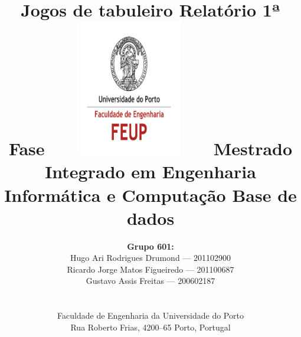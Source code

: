\documentclass[a4paper]{article}
\begin{document}
\setlength{\textwidth}{16cm}
\setlength{\textheight}{22cm}

\title{\Huge\textbf{Jogos de tabuleiro}\linebreak\linebreak\linebreak
\Large\textbf{Relatório 1ª Fase}\linebreak\linebreak
\includegraphics[height=6cm, width=7cm]{feup.pdf}\linebreak \linebreak
\Large{Mestrado Integrado em Engenharia Informática e Computação} \linebreak \linebreak
\Large{Base de dados}\linebreak
}

\author{\textbf{Grupo 601:}\\ Hugo Ari Rodrigues Drumond --- 201102900 \\  Ricardo Jorge Matos Figueiredo --- 201100687 \\ Gustavo Assis Freitas --- 200602187\\\linebreak\linebreak \\
 \\ Faculdade de Engenharia da Universidade do Porto \\ Rua Roberto Frias, 4200--65 Porto, Portugal \linebreak\linebreak\linebreak
\linebreak\linebreak\vspace{1cm}}
\maketitle
\thispagestyle{empty}
\end{document}
